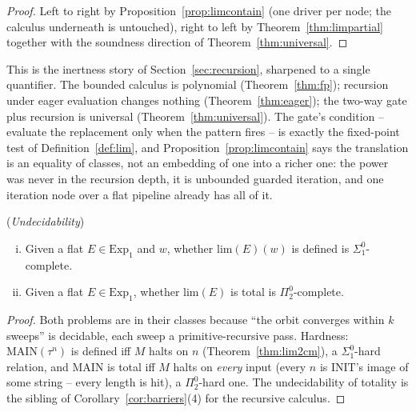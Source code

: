 \documentclass[runningheads,envcountsect]{llncs}
\begin{document}
\begin{proof}
    Left to right by Proposition~\ref{prop:limcontain} (one driver per
    node; the calculus underneath is untouched), right to left by
    Theorem~\ref{thm:limpartial} together with the soundness direction
    of Theorem~\ref{thm:universal}.
\end{proof}

This is the inertness story of Section~\ref{sec:recursion}, sharpened
to a single quantifier. The bounded calculus is polynomial
(Theorem~\ref{thm:fp}); recursion under eager evaluation changes
nothing (Theorem~\ref{thm:eager}); the two-way gate plus recursion is
universal (Theorem~\ref{thm:universal}). The gate's condition --
evaluate the replacement only when the pattern fires -- is exactly the
fixed-point test of Definition~\ref{def:lim}, and
Proposition~\ref{prop:limcontain} says the translation is an
equality of classes, not an embedding of one into a richer one: the
power was never in the recursion depth, it is unbounded guarded
iteration, and one iteration node over a flat pipeline already has
all of it.

\begin{corollary}
    (\emph{Undecidability})
    \label{cor:limundec}
    \begin{enumerate}[(i)]
        \item Given a flat $E \in \mathrm{Exp}_1$ and $w$, whether
        $\mathrm{lim}(E)(w)$ is defined is $\Sigma^0_1$-complete.
        \item Given a flat $E \in \mathrm{Exp}_1$, whether
        $\mathrm{lim}(E)$ is total is $\Pi^0_2$-complete.
    \end{enumerate}
\end{corollary}

\begin{proof}
    Both problems are in their classes because ``the orbit converges
    within $k$ sweeps'' is decidable, each sweep a primitive-recursive
    pass. Hardness: $\mathrm{MAIN}(\tau^{n})$ is defined iff $M$ halts
    on $n$ (Theorem~\ref{thm:lim2cm}), a $\Sigma^0_1$-hard relation,
    and $\mathrm{MAIN}$ is total iff $M$ halts on \emph{every} input
    (every $n$ is $\mathrm{INIT}$'s image of some string -- every
    length is hit), a $\Pi^0_2$-hard one. The undecidability of
    totality is the sibling of Corollary~\ref{cor:barriers}(4) for the
    recursive calculus.
\end{proof}
\end{document}

